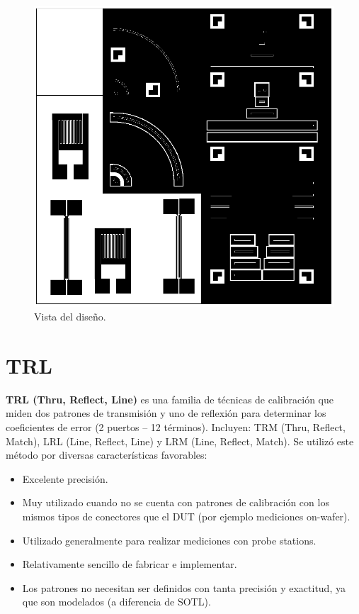 \documentclass[10pt, a4paper, twocolumn]{article}
\begin{document}
\begin{figure}[hbt!]
	\includegraphics[width=\linewidth]{Fotos/pcb.png}
	\caption{Vista del diseño.}
\end{figure}

\section{TRL}
\textbf{TRL (Thru, Reflect, Line)} es una familia de técnicas de calibración que
miden dos patrones de transmisión y uno de reflexión para determinar los
coeficientes de error (2 puertos – 12 términos). Incluyen: TRM (Thru, Reflect, Match), LRL (Line, Reflect, Line) y LRM (Line, Reflect, Match). Se utilizó este método por diversas
características favorables:
\begin{itemize}
\item Excelente precisión.
\item Muy utilizado cuando no se cuenta con patrones de calibración con los mismos tipos de conectores que el DUT (por ejemplo mediciones on-wafer).
\item Utilizado generalmente para realizar mediciones con probe stations.
\item Relativamente sencillo de fabricar e implementar.
\item Los patrones no necesitan ser definidos con tanta precisión y exactitud, ya que son modelados (a diferencia de SOTL).
\end{itemize}
\end{document}
